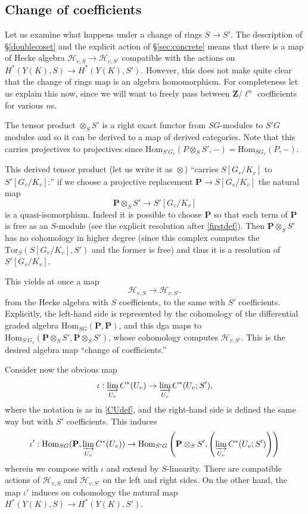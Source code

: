 \documentclass[10pt]{amsart}
\newcommand{\Z}{\mathbf{Z}}
\newcommand{\Hom}{\mathrm{Hom}}
\theoremstyle{remark}
\begin{document}
\subsection{Change of coefficients} \label{DHA:oddsandends1}
 
Let us examine what happens under a change of rings $S \rightarrow S'$.  
The description of \S \ref{doublecoset} and the explicit action of \S \ref{sec:concrete}
means that there is a map of Hecke algebra $\mathscr{H}_{v,S} \rightarrow \mathscr{H}_{v, S'}$
compatible with the actions on $H^*(Y(K), S) \rightarrow H^*(Y(K), S')$. However, this does not make quite clear that the change
of rings map is an algebra homomorphism. For completeness let us explain this now, since
we will want to freely pass between $\Z/\ell^n$ coefficients for various $n$s. 


 
The  tensor product $ \otimes_{S} S'$  is a right exact functor from $SG$-modules to $S'G $ modules 
and so it can be derived to a map 
of derived categories.  Note that this carries projectives to projectives since $\Hom_{S'G_v}(P \otimes_{S} S', -) = \Hom_{SG_v} (P, -)$.


This derived tensor product (let us write it as $\underline{\otimes}$) ``carries $S[G_v/K_v]$ to $S'[G_v/K_v]$:''
if we choose a projective replacement $\mathbf{P} \rightarrow S[G_v/K_v]$ the natural map
$$\mathbf{P} \otimes_{S} S' \longrightarrow S'[G_v/K_v]$$
is a quasi-isomorphism. 
Indeed it is possible to choose $\mathbf{P}$
so that each term of $\mathbf{P}$ is free as an $S$-module (see the explicit resolution after \eqref{firstdef}). Then $\mathbf{P} \otimes_{S} S'$
has no cohomology in higher degree (since this complex computes the $\mathrm{Tor}_S(S[G_v/K_v], S')$ and
the former is free) and thus it is a resolution of $S'[G_v/K_v]$.
%


 

 
This yields at once a map
$$ \mathscr{H}_{v,S} \rightarrow \mathscr{H}_{v, S'}.$$ 
from the Hecke algebra with $S$ coefficients, to the same with $S'$ coefficients.  
Explicitly, the left-hand side is represented by the cohomology of the differential graded algebra $\Hom_{SG}(\mathbf{P}, \mathbf{P})$, and this 
dga maps to $\Hom_{S'G_v}(\mathbf{P}\otimes_S S', \mathbf{P} \otimes_{S} S')$, whose cohomology computes $\mathscr{H}_{v,S'}$.  This is the desired algebra map ``change of coefficients.'' 

 
 Consider now the  obvious map
 $$ \iota: \varinjlim_{U_v} C^*(U_v)   \rightarrow \varinjlim_{U_v} C^*(U_v; S'),$$
 where the notation is as in  \eqref{CUdef}, and the right-hand side is defined the same way but with $S'$ coefficients. 
This induces 
 $$\iota':  \Hom_{SG}(\mathbf{P},  \varinjlim_{U_v} C^*(U_v)    ) \rightarrow \Hom_{S'G} \left( \mathbf{P} \otimes_S S',  \left(  \varinjlim_{U_v} C^*(U_v; S') \right) \right)$$
 wherein we compose with $\iota$ and extend by $S$-linearity.  There are compatible actions of $\mathscr{H}_{v,S}$
 and $\mathscr{H}_{v,S'}$ on the left and right sides.  On the other hand,  the map $\iota'$
 induces on cohomology the natural map $H^*(Y(K), S) \rightarrow H^*(Y(K), S')$. 
    
\end{document}
